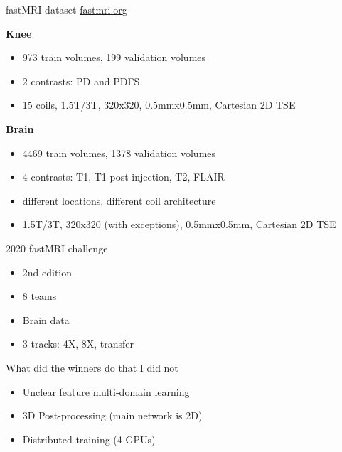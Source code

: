 \begin{frame}{fastMRI dataset}
    \href{https://fastmri.org/}{fastmri.org}
    \begin{multicols}{2}
        \textbf{Knee}
        \begin{itemize}
            \item 973 train volumes, 199 validation volumes
            \item 2 contrasts: PD and PDFS
            \item 15 coils, 1.5T/3T, 320x320, 0.5mmx0.5mm, Cartesian 2D TSE
        \end{itemize}
        \newpage
        \textbf{Brain}
        \begin{itemize}
            \item 4469 train volumes, 1378 validation volumes
            \item 4 contrasts: T1, T1 post injection, T2, FLAIR
            \item different locations, different coil architecture
            \item 1.5T/3T, 320x320 (with exceptions), 0.5mmx0.5mm, Cartesian 2D TSE
        \end{itemize}
    \end{multicols}
\end{frame}

\begin{frame}{2020 fastMRI challenge}
    \begin{itemize}
        \item 2nd edition
        \item 8 teams
        \item Brain data
        \item 3 tracks: 4X, 8X, transfer
    \end{itemize}
\end{frame}

\begin{frame}{What did the winners do that I did not}
    \begin{itemize}
        \item Unclear feature multi-domain learning
        \item 3D Post-processing (main network is 2D)
        \item Distributed training (4 GPUs)
    \end{itemize}
\end{frame}

